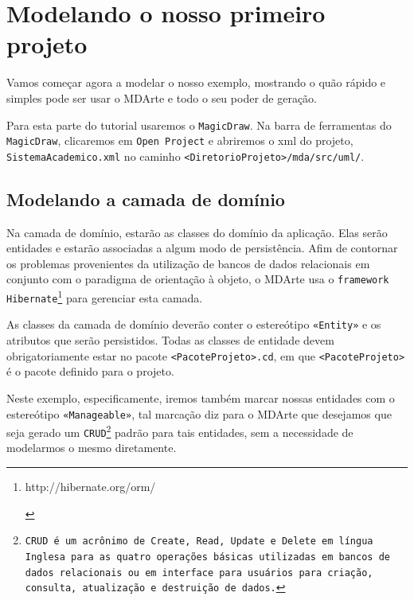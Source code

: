 \begin{framed}
	
\end{framed}

\section{Modelando o nosso primeiro projeto}

Vamos começar agora a modelar o nosso exemplo, mostrando o quão rápido e simples
pode ser usar o MDArte e todo o seu poder de geração.

Para esta parte do tutorial usaremos o \texttt{MagicDraw}. Na barra de
ferramentas do \texttt{MagicDraw}, clicaremos em \texttt{Open Project} e
abriremos o xml do projeto, \texttt{SistemaAcademico.xml} no caminho
\texttt{<DiretorioProjeto>/mda/src/uml/}.

\subsection{Modelando a camada de domínio}
Na camada de domínio, estarão as classes do domínio da aplicação. Elas serão
entidades e estarão associadas a algum modo de persistência. Afim de
contornar os problemas provenientes da utilização de bancos de dados relacionais
em conjunto com o paradigma de orientação à objeto, o MDArte usa o \texttt{framework}
\texttt{Hibernate}\footnote{\hypertarget{http://hibernate.org/orm/}{http://hibernate.org/orm/}}
para gerenciar esta camada.

As classes da camada de domínio deverão conter o estereótipo \texttt{«Entity»} e
os atributos que serão persistidos. Todas as classes de entidade devem
obrigatoriamente estar no pacote \texttt{<PacoteProjeto>.cd}, em que
\texttt{<PacoteProjeto>} é o pacote definido para o projeto.

Neste exemplo, especificamente, iremos também marcar nossas entidades com o
estereótipo \texttt{«Manageable»}, tal marcação diz para o MDArte que desejamos
que seja gerado um \texttt{CRUD\footnote{CRUD é um acrônimo de Create, Read,
Update e Delete em língua Inglesa para as quatro operações básicas utilizadas em
bancos de dados relacionais ou em interface para usuários para criação,
consulta, atualização e destruição de dados.}} padrão para tais entidades, sem a
necessidade de modelarmos o mesmo diretamente.

